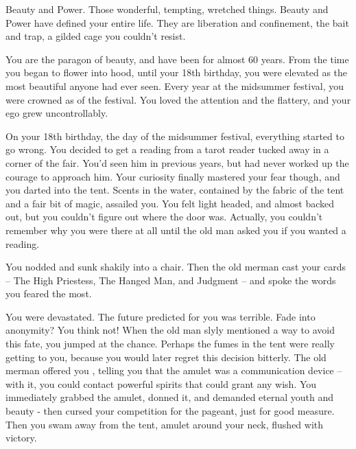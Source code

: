\documentclass[char]{NeptuneBall}
\begin{document}
\name{\cWitch{}}




Beauty and Power. Those wonderful, tempting, wretched things. Beauty and Power have defined your entire life. They are liberation and confinement, the bait and trap, a gilded cage you couldn't resist.

You are the paragon of beauty, and have been for almost 60 years. From the time you began to flower into \cWitch{\human}hood, until your 18th birthday, you were elevated as the most beautiful \cWitch{\mer} anyone had ever seen. Every year at the midsummer festival, you were crowned as \cWitch{\King} of the festival. You loved the attention and the flattery, and your ego grew uncontrollably.

On your 18th birthday, the day of the midsummer festival, everything started to go wrong. You decided to get a reading from a tarot reader tucked away in a corner of the fair. You'd seen him in previous years, but had never worked up the courage to approach him. Your curiosity finally mastered your fear though, and you darted into the tent. Scents in the water, contained by the fabric of the tent and a fair bit of magic, assailed you. You felt light headed, and almost backed out, but you couldn't figure out where the door was. Actually, you couldn't remember why you were there at all until the old man asked you if you wanted a reading.

You nodded and sunk shakily into a chair. Then the old merman cast your cards -- The High Priestess, The Hanged Man, and Judgment -- and spoke the words you feared the most.

You were devastated. The future predicted for you was terrible. Fade into anonymity? You think not! When the old man slyly mentioned a way to avoid this fate, you jumped at the chance. Perhaps the fumes in the tent were really getting to you, because you would later regret this decision bitterly. The old merman offered you \iAmulet{\MYname}, telling you that the amulet was a communication device -- with it, you could contact powerful spirits that could grant any wish. You immediately grabbed the amulet, donned it, and demanded eternal youth and beauty - then cursed your competition for the pageant, just for good measure. Then you swam away from the tent, amulet around your neck, flushed with victory. 
\end{document}
